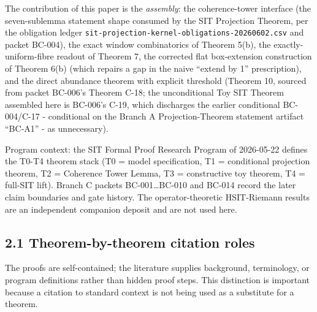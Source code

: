 \documentclass[
  american,
  11pt,
  letterpaper,
]{article}
\begin{document}
The contribution of this paper is the \emph{assembly}: the coherence-tower interface (the seven-sublemma statement shape consumed by the SIT Projection Theorem, per the obligation ledger \nolinkurl{sit-projection-kernel-obligations-20260602.csv} and packet BC-004), the exact window combinatorics of Theorem 5(b), the exactly-uniform-fibre readout of Theorem 7, the corrected flat box-extension construction of Theorem 6(b) (which repairs a gap in the naive ``extend by 1'' prescription), and the direct abundance theorem with explicit threshold (Theorem 10, sourced from packet BC-006's Theorem C-18; the unconditional Toy SIT Theorem assembled here is BC-006's C-19, which discharges the earlier conditional BC-004/C-17 - conditional on the Branch A Projection-Theorem statement artifact ``BC-A1'' - as unnecessary).

Program context: the SIT Formal Proof Research Program of 2026-05-22 defines the T0-T4 theorem stack (T0 = model specification, T1 = conditional projection theorem, T2 = Coherence Tower Lemma, T3 = constructive toy theorem, T4 = full-SIT lift). Branch C packets BC-001\ldots BC-010 and BC-014 record the later claim boundaries and gate history. The operator-theoretic HSIT-Riemann results are an independent companion deposit and are not used here.

\subsection{2.1 Theorem-by-theorem citation roles}\label{theorem-by-theorem-citation-roles}

The proofs are self-contained; the literature supplies background, terminology, or program definitions rather than hidden proof steps. This distinction is important because a citation to standard context is not being used as a substitute for a theorem.
\end{document}
